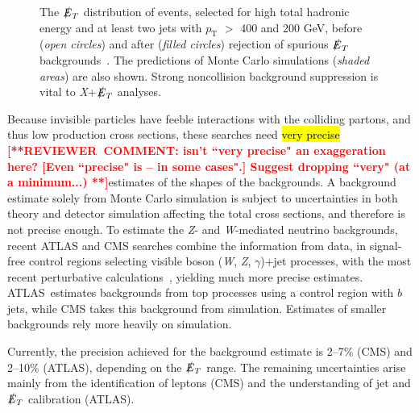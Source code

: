 \documentclass{ar-1col}
\newcommand{\IP}{invisible particle}
\newcommand{\pt}{\ensuremath{p_\mathrm{T}}\xspace}
\newcommand{\MET}{\ensuremath{\slashed{E}_T}\xspace}
\begin{document}
\begin{figure}[!htpb]
\caption{The \MET distribution of events, selected for high total
hadronic energy and at least two jets with \pt{} $>$ 400 and 200
GeV, before (\textit{open circles}) and after (\textit{filled circles}) rejection of
spurious \MET backgrounds~\cite{CMS-PAS-JME-16-004}. The
predictions of Monte Carlo  simulations (\textit{shaded areas}) are also shown. Strong
noncollision background suppression is vital to \textit{X}+\MET analyses.}
\label{fig:fakeMET}
\end{figure}

Because {\IP}s have feeble interactions with the colliding
partons, and thus low production cross sections, these searches
need \hl{very precise} \textbf{\textcolor{red}{[**REVIEWER\ COMMENT: isn't ``very precise" an exaggeration here?  [Even ``precise" is -- in some cases".]  Suggest dropping ``very" (at a minimum...) **]}}estimates of the shapes of the backgrounds. A
background estimate solely from Monte Carlo simulation is subject to
uncertainties in both theory and detector simulation affecting the
total cross sections, and therefore is not precise enough. To
estimate the \textit{Z}- and \textit{W}-mediated neutrino backgrounds, recent ATLAS
and CMS searches combine the information from data, in signal-free
{control regions} selecting visible boson (\textit{W},
\textit{Z}, $\gamma$)+jet processes, with the most recent perturbative
calculations~\cite{Lindert:2017olm}, yielding much more precise estimates.
ATLAS\ estimates backgrounds from top processes using a
control region with $b$ jets, while CMS takes this background from
simulation. Estimates of smaller backgrounds rely more heavily on
simulation.

Currently, the precision achieved for the background estimate is 2--7\%
(CMS) and 2--10\% (ATLAS), depending on the \MET range. The
remaining uncertainties arise mainly from the identification of
leptons (CMS) and the understanding of jet and \MET
calibration (ATLAS).
\end{document}

